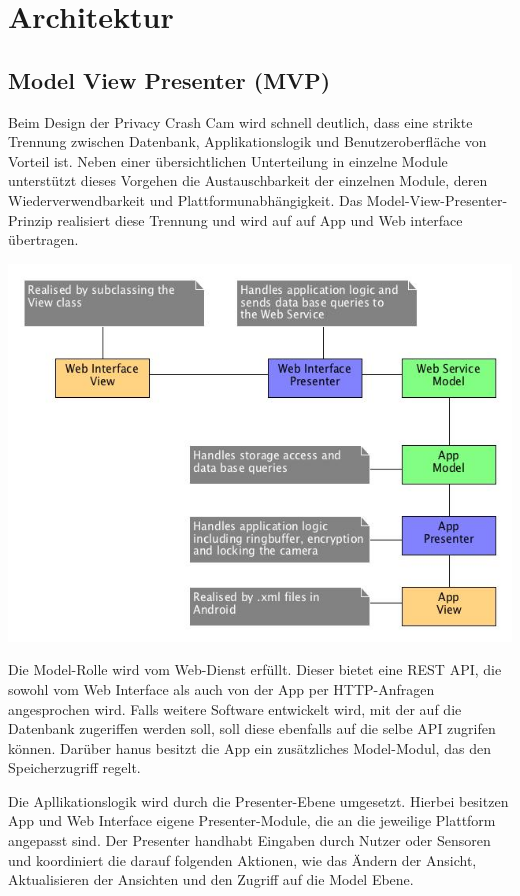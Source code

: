 \chapter{Architektur}
\section{Model View Presenter (MVP)}
Beim Design der Privacy Crash Cam wird schnell deutlich, dass eine strikte Trennung zwischen Datenbank, Applikationslogik und Benutzeroberfläche von Vorteil ist. Neben einer übersichtlichen Unterteilung in einzelne Module unterstützt dieses Vorgehen die Austauschbarkeit der einzelnen Module, deren Wiederverwendbarkeit und Plattformunabhängigkeit. Das Model-View-Presenter-Prinzip realisiert diese Trennung und wird auf auf App und Web interface übertragen.\linebreak\par

\includegraphics[scale=0.5]{./resources/Diagramme/overview_mvp.jpg}

Die Model-Rolle wird vom Web-Dienst erfüllt. Dieser bietet eine REST API, die sowohl vom Web Interface als auch von der App per HTTP-Anfragen angesprochen wird. Falls weitere Software entwickelt wird, mit der auf die Datenbank zugeriffen werden soll, soll diese ebenfalls auf die selbe API zugrifen können.\linebreak
Darüber hanus besitzt die App ein zusätzliches Model-Modul, das den Speicherzugriff regelt.\linebreak\par

Die Apllikationslogik wird durch die Presenter-Ebene umgesetzt. Hierbei besitzen App und Web Interface eigene Presenter-Module, die an die jeweilige Plattform angepasst sind. Der Presenter handhabt Eingaben durch Nutzer oder Sensoren und koordiniert die darauf folgenden Aktionen, wie das Ändern der Ansicht, Aktualisieren der Ansichten und den Zugriff auf die Model Ebene.\linebreak\par 

